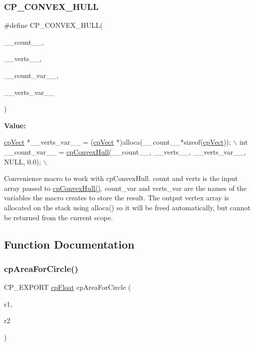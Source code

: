 \subsubsection{\texorpdfstring{C\+P\+\_\+\+C\+O\+N\+V\+E\+X\+\_\+\+H\+U\+LL}{CP\_CONVEX\_HULL}}
{\footnotesize\ttfamily \#define C\+P\+\_\+\+C\+O\+N\+V\+E\+X\+\_\+\+H\+U\+LL(\begin{DoxyParamCaption}\item[{}]{\+\_\+\+\_\+count\+\_\+\+\_\+,  }\item[{}]{\+\_\+\+\_\+verts\+\_\+\+\_\+,  }\item[{}]{\+\_\+\+\_\+count\+\_\+var\+\_\+\+\_\+,  }\item[{}]{\+\_\+\+\_\+verts\+\_\+var\+\_\+\+\_\+ }\end{DoxyParamCaption})}

{\bfseries Value\+:}
\begin{DoxyCode}
\mbox{\hyperlink{structcp_vect}{cpVect}} *\_\_verts\_var\_\_ = (\mbox{\hyperlink{structcp_vect}{cpVect}} *)alloca(\_\_count\_\_*\textcolor{keyword}{sizeof}(\mbox{\hyperlink{structcp_vect}{cpVect}})); \(\backslash\)
int \_\_count\_var\_\_ = \mbox{\hyperlink{group__misc_ga94ed1fc4d2c987c3e4df3cb16b12a156}{cpConvexHull}}(\_\_count\_\_, \_\_verts\_\_, \_\_verts\_var\_\_, NULL, 0.0); \(\backslash\)
\end{DoxyCode}
Convenience macro to work with cp\+Convex\+Hull. {\ttfamily count} and {\ttfamily verts} is the input array passed to \mbox{\hyperlink{group__misc_ga94ed1fc4d2c987c3e4df3cb16b12a156}{cp\+Convex\+Hull()}}. {\ttfamily count\+\_\+var} and {\ttfamily verts\+\_\+var} are the names of the variables the macro creates to store the result. The output vertex array is allocated on the stack using alloca() so it will be freed automatically, but cannot be returned from the current scope. 

\subsection{Function Documentation}
\mbox{\label{group__misc_ga55a50f3dfa695db703759e550db16bce}} 
\subsubsection{\texorpdfstring{cp\+Area\+For\+Circle()}{cpAreaForCircle()}}
{\footnotesize\ttfamily C\+P\+\_\+\+E\+X\+P\+O\+RT \mbox{\hyperlink{group__basic_types_gac1ed65573e035bf892505768c852d8d3}{cp\+Float}} cp\+Area\+For\+Circle (\begin{DoxyParamCaption}\item[{\mbox{\hyperlink{group__basic_types_gac1ed65573e035bf892505768c852d8d3}{cp\+Float}}}]{r1,  }\item[{\mbox{\hyperlink{group__basic_types_gac1ed65573e035bf892505768c852d8d3}{cp\+Float}}}]{r2 }\end{DoxyParamCaption})}

